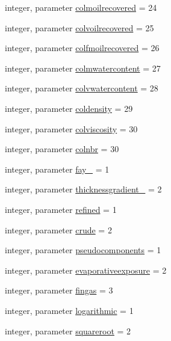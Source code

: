 \begin{DoxyCompactItemize}
\item 
integer, parameter \mbox{\hyperlink{namespacemoduleoil_a037325aef7bc894d7a245eaff634677f}{colmoilrecovered}} = 24
\item 
integer, parameter \mbox{\hyperlink{namespacemoduleoil_a50de48619d92d9d816b55ef4169e63be}{colvoilrecovered}} = 25
\item 
integer, parameter \mbox{\hyperlink{namespacemoduleoil_a3d323118340637b27ba2f0d81a08b14b}{colfmoilrecovered}} = 26
\item 
integer, parameter \mbox{\hyperlink{namespacemoduleoil_aef12293605401def345b9d9648095e37}{colmwatercontent}} = 27
\item 
integer, parameter \mbox{\hyperlink{namespacemoduleoil_a24f3e477cedecbea5dbebf0029597e9a}{colvwatercontent}} = 28
\item 
integer, parameter \mbox{\hyperlink{namespacemoduleoil_a5a4aff8481aa609e74b890613af52e7a}{coldensity}} = 29
\item 
integer, parameter \mbox{\hyperlink{namespacemoduleoil_a0c2df7caf6e999192a0b444702e943fe}{colviscosity}} = 30
\item 
integer, parameter \mbox{\hyperlink{namespacemoduleoil_a30c511c7fa2c51a98b83d1388c6777c2}{colnbr}} = 30
\item 
integer, parameter \mbox{\hyperlink{namespacemoduleoil_a9bbc6e1f4a84d5cd13db1cf6c2a97b29}{fay\+\_\+}} = 1
\item 
integer, parameter \mbox{\hyperlink{namespacemoduleoil_af5497b75883cdc370714d52a6e24a73f}{thicknessgradient\+\_\+}} = 2
\item 
integer, parameter \mbox{\hyperlink{namespacemoduleoil_a9323fa2198772c36833e461c7a6af583}{refined}} = 1
\item 
integer, parameter \mbox{\hyperlink{namespacemoduleoil_a26b19843dbe29efd606aed575f35992a}{crude}} = 2
\item 
integer, parameter \mbox{\hyperlink{namespacemoduleoil_a18fce47bd4924b7621307278097862ce}{pseudocomponents}} = 1
\item 
integer, parameter \mbox{\hyperlink{namespacemoduleoil_abfa265d4d464527590649fbc8833c4cc}{evaporativeexposure}} = 2
\item 
integer, parameter \mbox{\hyperlink{namespacemoduleoil_a3bcbe2b9305965ab2c0223d559521a7a}{fingas}} = 3
\item 
integer, parameter \mbox{\hyperlink{namespacemoduleoil_aadde4442048e01350a934a357e8954c7}{logarithmic}} = 1
\item 
integer, parameter \mbox{\hyperlink{namespacemoduleoil_abe60bae5ccf18abdda41e423a7c5daab}{squareroot}} = 2

\end{DoxyCompactItemize}
